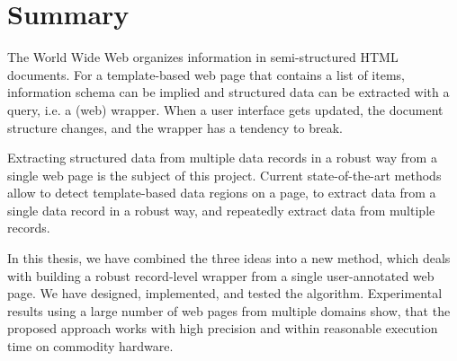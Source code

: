 \chapter{Summary}
\label{summary}


The World Wide Web organizes information in semi-structured HTML documents. For a template-based web page that contains a list of items, information schema can be implied and structured data can be extracted with a query, i.e. a (web) wrapper. When a user interface gets updated, the document structure changes, and the wrapper has a tendency to break. 

Extracting structured data from multiple data records in a robust way from a single web page is the subject of this project. Current state-of-the-art methods allow to detect template-based data regions on a page, to extract data from a single data record in a robust way, and repeatedly extract data from multiple records. 

In this thesis, we have combined the three ideas into a new method, which deals with building a robust record-level wrapper from a single user-annotated web page. We have designed, implemented, and tested the algorithm. Experimental results using a large number of web pages from multiple domains show, that the proposed approach works with high precision and within reasonable execution time on commodity hardware.


